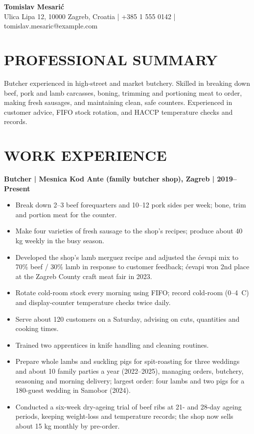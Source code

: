 \documentclass[11pt,a4paper]{article}
\begin{document}
\begin{center}
{\Huge\bfseries\color{primarycolor} Tomislav Mesarić}\\[0.4em]
{\small\color{accentcolor} Ulica Lipa 12, 10000 Zagreb, Croatia | +385 1 555 0142 | tomislav.mesaric@example.com}
\end{center}
\vspace{0.5em}

\section*{PROFESSIONAL SUMMARY}
Butcher experienced in high-street and market butchery. Skilled in breaking down beef, pork and lamb carcasses, boning, trimming and portioning meat to order, making fresh sausages, and maintaining clean, safe counters. Experienced in customer advice, FIFO stock rotation, and HACCP temperature checks and records.

\section*{WORK EXPERIENCE}
\textbf{Butcher | Mesnica Kod Ante (family butcher shop), Zagreb | 2019--Present}
\begin{itemize}
\item Break down 2--3 beef forequarters and 10--12 pork sides per week; bone, trim and portion meat for the counter.
\item Make four varieties of fresh sausage to the shop's recipes; produce about 40 kg weekly in the busy season.
\item Developed the shop's lamb merguez recipe and adjusted the ćevapi mix to 70\% beef / 30\% lamb in response to customer feedback; ćevapi won 2nd place at the Zagreb County craft meat fair in 2023.
\item Rotate cold-room stock every morning using FIFO; record cold-room (0--4~\textdegree C) and display-counter temperature checks twice daily.
\item Serve about 120 customers on a Saturday, advising on cuts, quantities and cooking times.
\item Trained two apprentices in knife handling and cleaning routines.
\item Prepare whole lambs and suckling pigs for spit-roasting for three weddings and about 10 family parties a year (2022--2025), managing orders, butchery, seasoning and morning delivery; largest order: four lambs and two pigs for a 180-guest wedding in Samobor (2024).
\item Conducted a six-week dry-ageing trial of beef ribs at 21- and 28-day ageing periods, keeping weight-loss and temperature records; the shop now sells about 15 kg monthly by pre-order.
\end{itemize}
\end{document}
